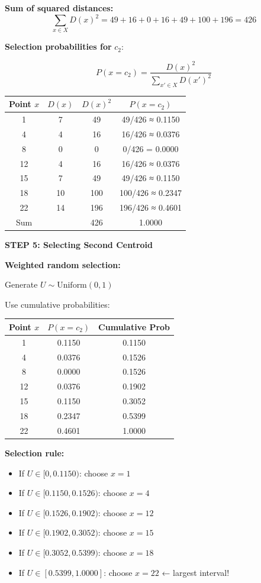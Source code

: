 \documentclass[12pt]{article}
\begin{document}
\begin{solution}
\textbf{Sum of squared distances:}
\[
\sum_{x \in X} D(x)^2 = 49 + 16 + 0 + 16 + 49 + 100 + 196 = 426
\]

\textbf{Selection probabilities for } $c_2$:

\[
P(x = c_2) = \frac{D(x)^2}{\sum_{x' \in X} D(x')^2}
\]

\begin{center}
\begin{tabular}{c|c|c|c}
Point $x$ & $D(x)$ & $D(x)^2$ & $P(x = c_2)$ \\
\hline
1 & 7 & 49 & 49/426 ≈ 0.1150 \\
4 & 4 & 16 & 16/426 ≈ 0.0376 \\
8 & 0 & 0 & 0/426 = 0.0000 \\
12 & 4 & 16 & 16/426 ≈ 0.0376 \\
15 & 7 & 49 & 49/426 ≈ 0.1150 \\
18 & 10 & 100 & 100/426 ≈ 0.2347 \\
22 & 14 & 196 & 196/426 ≈ 0.4601 \\
\hline
Sum & & 426 & 1.0000 \\
\end{tabular}
\end{center}

\textbf{STEP 5: Selecting Second Centroid}

\textbf{Weighted random selection:}

Generate $U \sim \text{Uniform}(0,1)$

Use cumulative probabilities:

\begin{center}
\begin{tabular}{c|c|c}
Point $x$ & $P(x = c_2)$ & Cumulative Prob \\
\hline
1 & 0.1150 & 0.1150 \\
4 & 0.0376 & 0.1526 \\
8 & 0.0000 & 0.1526 \\
12 & 0.0376 & 0.1902 \\
15 & 0.1150 & 0.3052 \\
18 & 0.2347 & 0.5399 \\
22 & 0.4601 & 1.0000 \\
\end{tabular}
\end{center}

\textbf{Selection rule:}
\begin{itemize}
    \item If $U \in [0, 0.1150)$: choose $x=1$
    \item If $U \in [0.1150, 0.1526)$: choose $x=4$
    \item If $U \in [0.1526, 0.1902)$: choose $x=12$
    \item If $U \in [0.1902, 0.3052)$: choose $x=15$
    \item If $U \in [0.3052, 0.5399)$: choose $x=18$
    \item If $U \in [0.5399, 1.0000]$: choose $x=22$ ← largest interval!
\end{itemize}


\end{solution}
\end{document}
